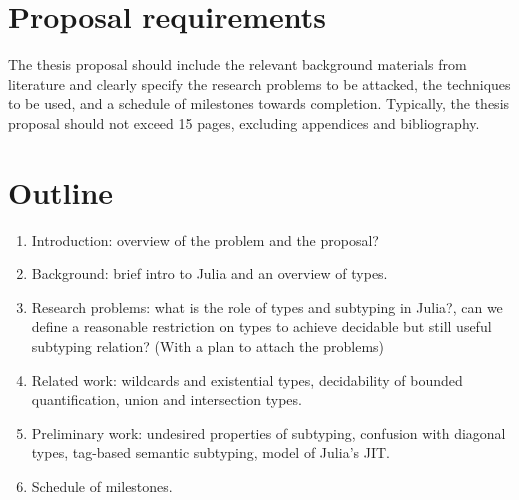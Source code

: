 \documentclass[11pt,
  footinclude,headinclude,
  abstract=on
]{scrreprt}
\begin{document}





\section{Proposal requirements}

The thesis proposal should include the relevant background materials from
literature and clearly specify the research problems to be attacked, the
techniques to be used, and a schedule of milestones towards completion.
Typically, the thesis proposal should not exceed 15 pages, excluding appendices
and bibliography.

\section{Outline}

\begin{enumerate}
  \item Introduction: overview of the problem and the proposal?
  \item Background: brief intro to Julia and an overview of types.
  \item Research problems: what is the role of types and subtyping in Julia?,
    can we define a reasonable restriction on types to achieve decidable but
    still useful subtyping relation? (With a plan to attach the problems)
  \item Related work: wildcards and existential types, decidability of bounded
    quantification, union and intersection types.
  \item Preliminary work: undesired properties of subtyping, confusion with
    diagonal types, tag-based semantic subtyping, model of Julia's JIT.
  \item Schedule of milestones.
\end{enumerate}









\end{document}
